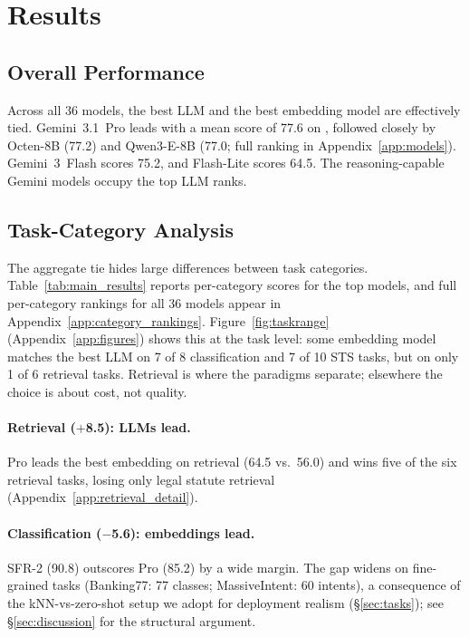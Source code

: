 \section{Results}
\label{sec:results}

\subsection{Overall Performance}
\label{sec:overall}

Across all 36 models, the best LLM and the best embedding model are effectively tied.
Gemini~3.1~Pro leads with a mean score of 77.6 on \mteblm{}, followed closely by Octen-8B (77.2) and Qwen3-E-8B (77.0; full ranking in Appendix~\ref{app:models}).
Gemini~3~Flash scores 75.2, and Flash-Lite scores 64.5. The reasoning-capable Gemini models occupy the top LLM ranks.

\subsection{Task-Category Analysis}
\label{sec:categories}

The aggregate tie hides large differences between task categories.
Table~\ref{tab:main_results} reports per-category scores for the top models, and full per-category rankings for all 36 models appear in Appendix~\ref{app:category_rankings}.
Figure~\ref{fig:taskrange} (Appendix~\ref{app:figures}) shows this at the task level: some embedding model matches the best LLM on 7 of 8 classification and 7 of 10 STS tasks, but on only 1 of 6 retrieval tasks.
Retrieval is where the paradigms separate; elsewhere the choice is about cost, not quality.



\paragraph{Retrieval ($+$8.5): LLMs lead.}
Pro leads the best embedding on retrieval (64.5 vs.\ 56.0) and wins five of the six retrieval tasks, losing only legal statute retrieval (Appendix~\ref{app:retrieval_detail}).

\paragraph{Classification ($-$5.6): embeddings lead.}
SFR-2 \citep{meng2024sfremb2} (90.8) outscores Pro (85.2) by a wide margin.
The gap widens on fine-grained tasks (Banking77: 77 classes; MassiveIntent: 60 intents), a consequence of the kNN-vs-zero-shot setup we adopt for deployment realism (\S\ref{sec:tasks}); see \S\ref{sec:discussion} for the structural argument.

